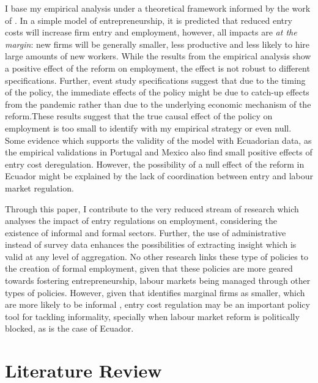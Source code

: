 \documentclass[11pt,a4paper]{article}\usepackage[]{graphicx}\usepackage[]{xcolor}
\begin{document}
I base my empirical analysis under a theoretical framework informed by the work of \textcite{Branstetter.2014}. In a simple model of entrepreneurship, it is predicted that reduced entry costs will increase firm entry and employment, however, all impacts are \textit{at the margin}: new firms will be generally smaller, less productive and less likely to hire large amounts of new workers. While the results from the empirical analysis show a positive effect of the reform on employment, the effect is not robust to different specifications. Further, event study specifications suggest that due to the timing of the policy, the immediate effects of the policy might be due to catch-up effects from the pandemic rather than due to the underlying economic mechanism of the reform.These results suggest that the true causal effect of the policy on employment is too small to identify with my empirical strategy or even null. Some evidence which supports the validity of the model with Ecuadorian data, as the empirical validations in Portugal \parencite{Branstetter.2014} and Mexico \parencite{Kaplan.2011} also find small positive effects of entry cost deregulation. However, the possibility of a null effect of the reform in Ecuador might be explained by the lack of coordination between entry and labour market regulation.

Through this paper, I contribute to the very reduced stream of research which analyses the impact of entry regulations on employment, considering the existence of informal and formal sectors. Further, the use of administrative instead of survey data enhances the possibilities of extracting insight which is valid at any level of aggregation. No other research links these type of policies to the creation of formal employment, given that these policies are more geared towards fostering entrepreneurship, labour markets being managed through other types of policies. However, given that \textcite{Branstetter.2014} identifies marginal firms as smaller, which are more likely to be informal \parencite{ElianeElBadaoui.2010}, entry cost regulation may be an important policy tool for tackling informality, specially when labour market reform is politically blocked, as is the case of Ecuador. 

\section{Literature Review}
\end{document}

